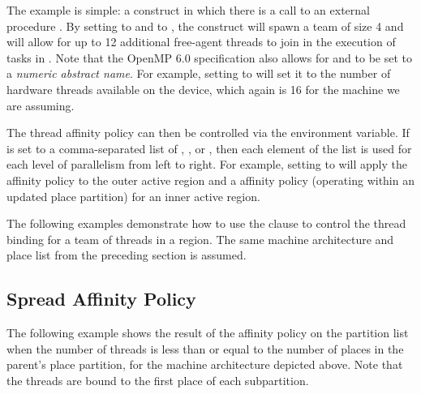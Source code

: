 

The example is simple: a  construct in which there is a call to
an external procedure . By setting  to 
and  to , the construct will spawn a team of size 4
and will allow for up to 12 additional free-agent threads to join in the execution
of tasks in . Note that the OpenMP 6.0 specification also allows for
 and  to be set to a
\emph{numeric abstract name}. For example, setting  to
 will set it to the number of hardware threads available on
the device, which again is 16 for the machine we are assuming.

The thread affinity policy can then be controlled via the 
environment variable. 
If  is set to
a comma-separated list of , , or ,
then each element of the list is used for each level of parallelism from left
to right. For example, setting  to 
will apply the  affinity policy to the outer active
 region and a  affinity policy (operating within
an updated place partition) for an inner active  region.


The following examples demonstrate how to use the  clause to
control the thread binding for a team of threads in a  region.
The same machine architecture and place list from the preceding section is
assumed.

\subsection{Spread Affinity Policy} \label{subsec:affinity_spread}
 


The following example shows the result of the  affinity policy on
the partition list when the number of threads is less than or equal to the
number of places in the parent's place partition, for the machine architecture
depicted above. Note that the threads are bound to the first place of each
subpartition.

